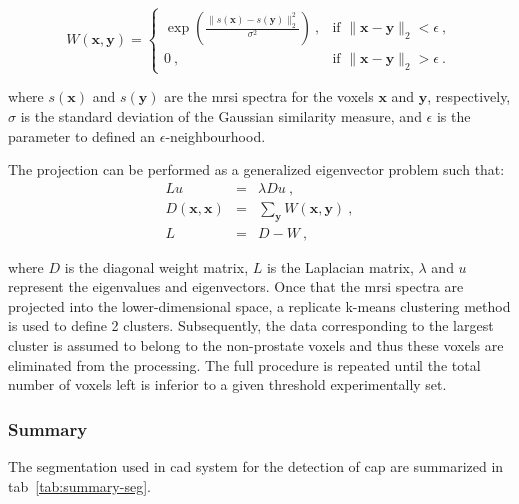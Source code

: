 \begin{equation}
	W(\mathbf{x},\mathbf{y}) =
	\begin{cases}	
	 	\exp \left( \frac{\| s(\mathbf{x}) - s(\mathbf{y}) \|_2^2}{\sigma^2} \right) \ , & \text{if } \| \mathbf{x} - \mathbf{y} \|_2 < \epsilon \ , \\
	 	0 \ , & \text{if } \| \mathbf{x} - \mathbf{y} \|_2 > \epsilon \ .
	 \end{cases}
	\label{eq:ge1}
\end{equation}

\noindent where $s(\mathbf{x})$ and $s(\mathbf{y})$ are the \ac{mrsi} spectra for the voxels $\mathbf{x}$ and $\mathbf{y}$, respectively, $\sigma$ is the standard deviation of the Gaussian similarity measure, and $\epsilon$ is the parameter to defined an $\epsilon$-neighbourhood.

The projection can be performed as a generalized eigenvector problem such that:
\begin{eqnarray}
  Lu & = & \lambda D u \ , \nonumber \\
  D(\mathbf{x},\mathbf{x}) & = & \sum_{\mathbf{y}} W(\mathbf{x},\mathbf{y}) \ , \label{eq:ge2} \\
  L & = & D-W \ , \nonumber
\end{eqnarray}

\noindent where $D$ is the diagonal weight matrix, $L$ is the Laplacian matrix, $\lambda$ and $u$ represent the eigenvalues and eigenvectors.
Once that the \ac{mrsi} spectra are projected into the lower-dimensional space, a replicate k-means clustering method is used to define 2 clusters.
Subsequently, the data corresponding to the largest cluster is assumed to belong to the non-prostate voxels and thus these voxels are eliminated from the processing.
The full procedure is repeated until the total number of voxels left is inferior to a given threshold experimentally set.


\subsubsection{Summary}

The segmentation used in \ac{cad} system for the detection of \ac{cap} are summarized in \ac{tab}~\ref{tab:summary-seg}.

